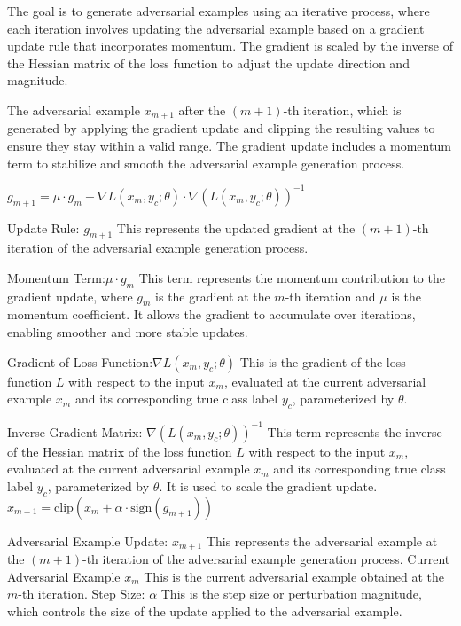 
The goal is to generate adversarial examples using an iterative process, where each iteration involves updating the adversarial example based on a gradient update rule that incorporates momentum. The gradient is scaled by the inverse of the Hessian matrix of the loss function to adjust the update direction and magnitude.

The adversarial example \(x_{m+1}\) after the \((m+1)\)-th iteration, which is generated by applying the gradient update and clipping the resulting values to ensure they stay within a valid range. The gradient update includes a momentum term to stabilize and smooth the adversarial example generation process.

$g_{m+1} = \mu \cdot g_m + \nabla L(x_m, y_c; \theta) \cdot \nabla(L(x_m, y_c; \theta))^{-1} \label{eq:gmplus1}$

Update Rule: $g_{m+1}$ This represents the updated gradient at the \((m+1)\)-th iteration of the adversarial example generation process.

Momentum Term:$\mu \cdot g_m$ This term represents the momentum contribution to the gradient update, where \(g_m\) is the gradient at the \(m\)-th iteration and \(\mu\) is the momentum coefficient. It allows the gradient to accumulate over iterations, enabling smoother and more stable updates.

Gradient of Loss Function:$\nabla L(x_m, y_c; \theta)$ This is the gradient of the loss function \(L\) with respect to the input \(x_m\), evaluated at the current adversarial example \(x_m\) and its corresponding true class label \(y_c\), parameterized by \(\theta\).

Inverse Gradient Matrix: $\nabla(L(x_m, y_c; \theta))^{-1}$ This term represents the inverse of the Hessian matrix of the loss function \(L\) with respect to the input \(x_m\), evaluated at the current adversarial example \(x_m\) and its corresponding true class label \(y_c\), parameterized by \(\theta\). 
It is used to scale the gradient update.$x_{m+1} = \text{clip} \left( x_m + \alpha \cdot \text{sign}(g_{m+1}) \right) \label{eq:xmplus1}$

Adversarial Example Update: $x_{m+1}$ This represents the adversarial example at the \((m+1)\)-th iteration of the adversarial example generation process.
Current Adversarial Example $x_m$ This is the current adversarial example obtained at the \(m\)-th iteration.
Step Size: $\alpha$ This is the step size or perturbation magnitude, which controls the size of the update applied to the adversarial example.


